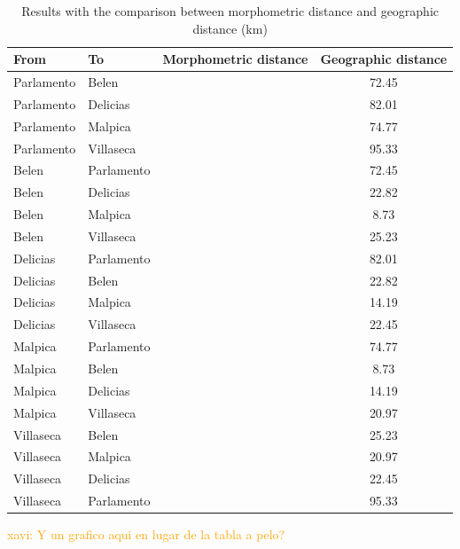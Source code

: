 \documentclass[review]{elsarticle}
\newcommand{\memo}[2]{\textcolor{#1}{#2}}
\newcommand{\xavi}[1]{\memo{orange}{xavi: #1\\}}
\begin{document}
\begin{table}[htp]
\begin{tabular}{llcc}
\hline
 From		& To 		& Morphometric distance	& Geographic distance\\ \hline
 Parlamento	& Belen		& 						&  72.45				 \\
 Parlamento	& Delicias	& 						&  82.01				 \\
 Parlamento	& Malpica   &                       	&  74.77                      \\
 Parlamento	& Villaseca	&						&  95.33					\\
 Belen		& Parlamento &						&  72.45						\\
 Belen		& Delicias   &						&  22.82      				 \\                                    
 Belen		& Malpica	&						&  8.73							\\	
 Belen		& Villaseca  &                       &  25.23                         \\
 Delicias	& Parlamento  &                      &  82.01                            \\
 Delicias	& Belen       &						&  22.82						\\
 Delicias	& Malpica     &						&  14.19						\\
 Delicias	& Villaseca   &						&  22.45						\\
 Malpica		& Parlamento  &						&  74.77						\\
 Malpica		& Belen       &						&  8.73						\\
 Malpica		& Delicias    &						&  14.19						\\
 Malpica    & Villaseca	  &						&  20.97                     \\
 Villaseca	& Belen       &						&  25.23					     \\	             Villaseca	& Malpica     &						&  20.97								\\
 Villaseca	& Delicias	  &						&  22.45								\\
 Villaseca	& Parlamento	  &						&  95.33								\\
                                                   
\hline

\end{tabular}
\caption{Results with the comparison between morphometric distance and geographic distance (km) }
\label{table:spatgeo}
\end{table}

\xavi{Y un grafico aqui en lugar de la tabla a pelo?}
\end{document}
